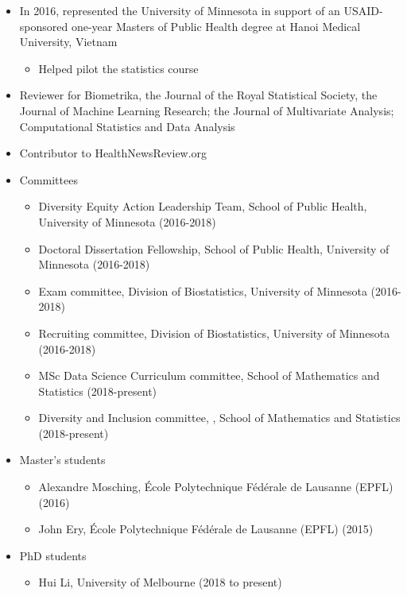 \documentclass{harnon-cv}
\begin{document}
{		
		
		
		\begin{itemize}
			\item In 2016, represented the University of Minnesota in support of an USAID-sponsored one-year Masters of Public Health degree at Hanoi Medical University, Vietnam
			\begin{itemize}
				\item Helped pilot the statistics course 
			\end{itemize}
			\item Reviewer for Biometrika, the Journal of the Royal Statistical Society, the Journal of Machine Learning Research; the Journal of Multivariate Analysis; Computational Statistics and Data Analysis
			\item Contributor to HealthNewsReview.org
			\item Committees
				\begin{itemize}
				\item Diversity Equity Action Leadership Team, School of Public Health, University of Minnesota (2016-2018)
				\item Doctoral Dissertation Fellowship, School of Public Health, University of Minnesota (2016-2018)
				\item Exam committee, Division of Biostatistics, University of Minnesota (2016-2018)
				\item Recruiting committee, Division of Biostatistics, University of Minnesota (2016-2018)
				\item MSc Data Science Curriculum committee, School of Mathematics and Statistics (2018-present)
				\item Diversity and Inclusion committee, , School of Mathematics and Statistics (2018-present)
				\end{itemize}
		\end{itemize}
		
		\begin{itemize}
			\item Master's students
			\begin{itemize}
				\item Alexandre Mosching, \'{E}cole Polytechnique F\'{e}d\'{e}rale de Lausanne (EPFL) (2016)
				\item John Ery, \'{E}cole Polytechnique F\'{e}d\'{e}rale de Lausanne (EPFL) (2015)
			\end{itemize}			
			\item PhD students
			\begin{itemize}
				\item Hui Li, University of Melbourne (2018 to present)
			\end{itemize}
		\end{itemize}
		
}
\end{document}
